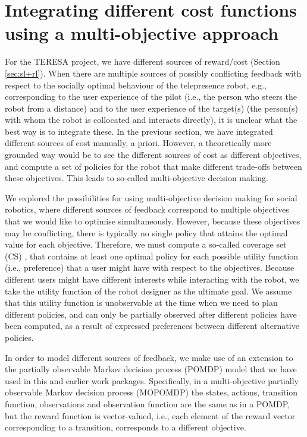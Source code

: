 \documentclass[a4paper,11pt]{report}
\begin{document}
\section{Integrating different cost functions using a multi-objective approach}\label{sec:mopomdp}
For the TERESA project, we have different sources of reward/cost (Section \ref{sec:sl+rl}). When there are multiple sources of possibly conflicting feedback with respect to the socially optimal behaviour of the telepresence robot, e.g.,  corresponding to the user experience of the pilot (i.e., the person who steers the robot from a distance) and to the user experience of the target(s) (the person(s) with whom the robot is collocated and interacts directly), it is unclear what the best way is to integrate these. In the previous section, we have integrated different sources of cost manually, a priori. However, a theoretically more grounded way would be to see the different sources of cost as different objectives, and compute a set of policies for the robot that make different trade-offs between these objectives. This leads to so-called multi-objective decision making. 

We explored the possibilities for using multi-objective decision making \cite{roijers13survey, roijersPhD} for social robotics,  where different sources of feedback correspond to multiple objectives that we would like to optimise simultaneously. However, because these objectives may be conflicting, there is typically no single policy that attains the optimal value for each objective. Therefore, we must compute a so-called coverage set (CS) \cite{roijers13survey}, that contains at least one optimal policy for each possible utility function (i.e., preference) that a user might have with respect to the objectives. Because different users might have different interests while interacting with the robot, we take the utility function of the robot designer as the ultimate goal. We assume that this utility function is unobservable at the time when we need to plan different policies, and can only be partially observed after different policies have been computed, as a result of expressed preferences between different alternative policies.

In order to model different sources of feedback, we make use of an extension to the partially observable Markov decision process (POMDP) model \cite{Kaelbling98} that we have used in this and earlier work packages. Specifically, in a multi-objective partially observable Markov decision process (MOPOMDP) \cite{soh2011,roijers2015point,wray2015} the states, actions, transition function, observations and observation function are the same as in a POMDP, but the reward function is vector-valued, i.e., each element of the reward vector corresponding to a transition, corresponds to a different objective. 
\end{document}
